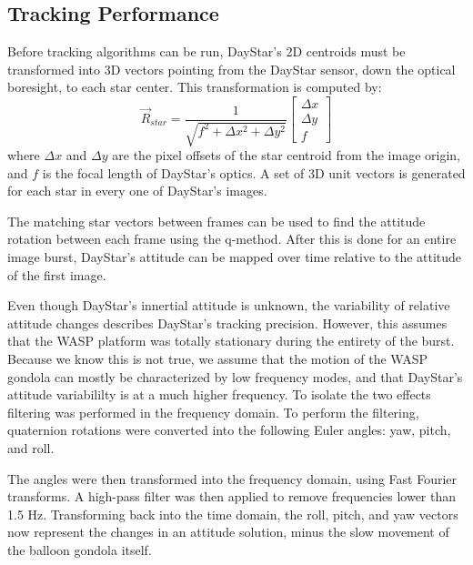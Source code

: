 \documentclass[twocolumn,letterpaper]{IEEEAerospace2012}
\newcommand{\brackets} [1] {\left[ #1 \right]}
\newcommand{\arrayb}[2]{\brackets{ \begin{array}{#1}  #2 \end{array} } }
\begin{document}
\subsection{Tracking Performance}
Before tracking algorithms can be run, DayStar's 2D centroids must be transformed into 3D vectors pointing from the DayStar sensor, down the optical boresight, to each star center. This transformation is computed by:
\begin{equation}
    \vec{R}_{star} = \frac{1}{\sqrt{f^2 + \Delta{x^2} + \Delta{y^2}}} \arrayb{c}{\Delta{x} \\ \Delta{y} \\ f}
\end{equation}
where $\Delta{x}$ and $\Delta{y}$ are the pixel offsets of the star centroid from the image origin, and $f$ is the focal length of DayStar's optics. A set of 3D unit vectors is generated for each star in every one of DayStar's images.

The matching star vectors between frames can be used to find the attitude rotation between each frame using the q-method. After this is done for an entire image burst, DayStar's attitude can be mapped over time relative to the attitude of the first image.

Even though DayStar's innertial attitude is unknown, the variability of relative attitude changes describes DayStar's tracking precision. However, this assumes that the WASP platform was totally stationary during the entirety of the burst. Because we know this is not true, we assume that the motion of the WASP gondola can mostly be characterized by low frequency modes, and that DayStar's attitude variabililty is at a much higher frequency. To isolate the two effects filtering was performed in the frequency domain. To perform the filtering, quaternion rotations were converted into the following Euler angles: yaw, pitch, and roll.

The angles were then transformed into the frequency domain, using Fast Fourier transforms. A high-pass filter was then applied to remove frequencies lower than 1.5 Hz. Transforming back into the time domain, the roll, pitch, and yaw vectors now represent the changes in an attitude solution, minus the slow movement of the balloon gondola itself.
\end{document}
